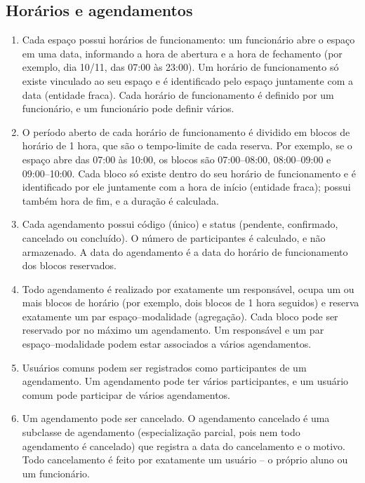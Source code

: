 \documentclass[11pt,a4paper]{article}
\begin{document}
\subsection{Horários e agendamentos}
\begin{enumerate}[resume*=req]
  \item Cada espaço possui horários de funcionamento: um funcionário abre o
        espaço em uma data, informando a hora de abertura e a hora de
        fechamento (por exemplo, dia 10/11, das 07:00 às 23:00). Um horário
        de funcionamento só existe vinculado ao seu espaço e é identificado pelo
        espaço juntamente com a data (entidade fraca). Cada horário de
        funcionamento é definido por um funcionário, e um funcionário pode
        definir vários.
  \item O período aberto de cada horário de funcionamento é dividido em
        blocos de horário de 1 hora, que são o tempo-limite de cada reserva.
        Por exemplo, se o espaço abre das 07:00 às 10:00, os blocos são
        07:00--08:00, 08:00--09:00 e 09:00--10:00. Cada bloco só existe
        dentro do seu horário de funcionamento e é identificado por ele
        juntamente com a hora de início (entidade fraca); possui também hora
        de fim, e a duração é calculada.
  \item Cada agendamento possui código (único) e status (pendente,
        confirmado, cancelado ou concluído). O número de participantes é
        calculado, e não armazenado. A data do agendamento é a data do
        horário de funcionamento dos blocos reservados.
  \item Todo agendamento é realizado por exatamente um responsável, ocupa um
        ou mais blocos de horário (por exemplo, dois blocos de 1 hora
        seguidos) e reserva exatamente um par espaço--modalidade (agregação).
        Cada bloco pode ser reservado por no máximo um agendamento. Um
        responsável e um par espaço--modalidade podem estar associados a
        vários agendamentos.
  \item Usuários comuns podem ser registrados como participantes de
        um agendamento. Um agendamento pode ter vários participantes, e um
        usuário comum pode participar de vários agendamentos.
  \item Um agendamento pode ser cancelado. O agendamento cancelado é uma
        subclasse de agendamento (especialização parcial, pois nem todo
        agendamento é cancelado) que registra a data do cancelamento e o
        motivo. Todo cancelamento é feito por exatamente um usuário -- o
        próprio aluno ou um funcionário.
\end{enumerate}
\end{document}
